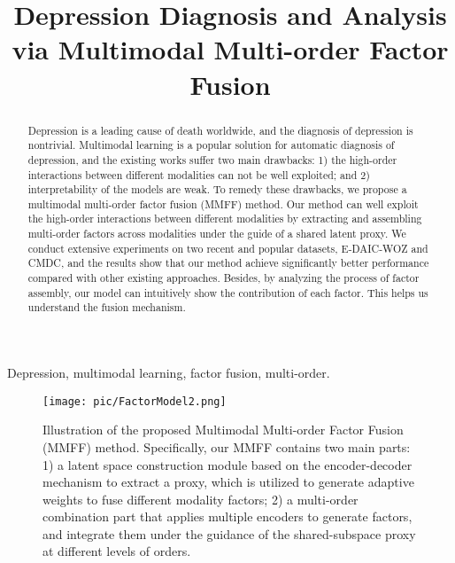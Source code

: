 \documentclass{article}
\begin{document}
\sloppy

\def\x{{\mathbf x}}
\def\L{{\cal L}}


\title{Depression Diagnosis and Analysis via Multimodal Multi-order Factor Fusion}
%
\address{}
\address{$^{\dagger}$Wuhan University, \{michael.yuan.cb,xuqianhui,luoyong\}@whu.edu.cn}


\maketitle

\begin{abstract}
Depression is a leading cause of death worldwide, and the diagnosis of depression is nontrivial.
Multimodal learning is a popular solution for automatic diagnosis of depression, and the existing works suffer two main drawbacks: 1) the high-order interactions between different modalities can not be well exploited; and 2) interpretability of the models are weak. To remedy these drawbacks, we propose a multimodal multi-order factor fusion (MMFF) method. Our method can well exploit the high-order interactions between different modalities by extracting and assembling multi-order factors across modalities under the guide of a shared latent proxy.
We conduct extensive experiments on two recent and popular datasets, E-DAIC-WOZ and CMDC, and the results show that our method achieve significantly better performance compared with other existing approaches. Besides, by analyzing the process of factor assembly, our model can intuitively show the contribution of each factor. This helps us understand the fusion mechanism. %
\end{abstract}
%
\begin{keywords}
Depression, multimodal learning, factor fusion, multi-order.
\end{keywords}
%
\begin{figure*}[!t]
	\centering
	\texttt{[image: pic/FactorModel2.png]}
	\caption{Illustration of the proposed Multimodal Multi-order Factor Fusion (MMFF) method. Specifically, our MMFF contains two main parts: 1) a latent space construction module based on the encoder-decoder mechanism to extract a proxy, which is utilized to generate adaptive weights to fuse different modality factors; 2) a multi-order combination part that applies multiple encoders to generate factors, and integrate them under the guidance of the shared-subspace proxy at different levels of orders.}
	\label{fig:factor}
\end{figure*}
\end{document}

